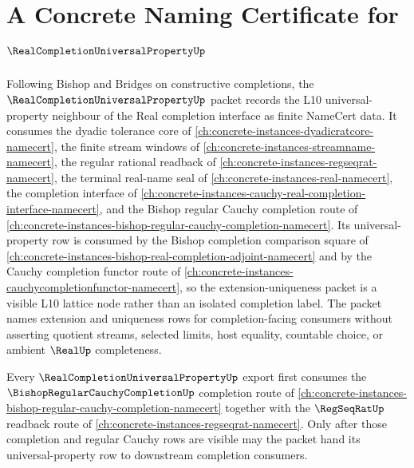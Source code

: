 \chapter{A Concrete Naming Certificate for $\RealCompletionUniversalPropertyUp$}
\label{ch:concrete-instances-real-completion-universal-property-namecert}

Following Bishop and Bridges on constructive completions, the $\RealCompletionUniversalPropertyUp$ packet records the L10 universal-property neighbour of the Real completion interface as finite NameCert data. It consumes the dyadic tolerance core of \autoref{ch:concrete-instances-dyadicratcore-namecert}, the finite stream windows of \autoref{ch:concrete-instances-streamname-namecert}, the regular rational readback of \autoref{ch:concrete-instances-regseqrat-namecert}, the terminal real-name seal of \autoref{ch:concrete-instances-real-namecert}, the completion interface of \autoref{ch:concrete-instances-cauchy-real-completion-interface-namecert}, and the Bishop regular Cauchy completion route of \autoref{ch:concrete-instances-bishop-regular-cauchy-completion-namecert}. Its universal-property row is consumed by the Bishop completion comparison square of \autoref{ch:concrete-instances-bishop-real-completion-adjoint-namecert} and by the Cauchy completion functor route of \autoref{ch:concrete-instances-cauchycompletionfunctor-namecert}, so the extension-uniqueness packet is a visible L10 lattice node rather than an isolated completion label. The packet names extension and uniqueness rows for completion-facing consumers without asserting quotient streams, selected limits, host equality, countable choice, or ambient $\RealUp$ completeness.

Every $\RealCompletionUniversalPropertyUp$ export first consumes the $\BishopRegularCauchyCompletionUp$ completion route of \autoref{ch:concrete-instances-bishop-regular-cauchy-completion-namecert} together with the $\RegSeqRatUp$ readback route of \autoref{ch:concrete-instances-regseqrat-namecert}. Only after those completion and regular Cauchy rows are visible may the packet hand its universal-property row to downstream completion consumers.

